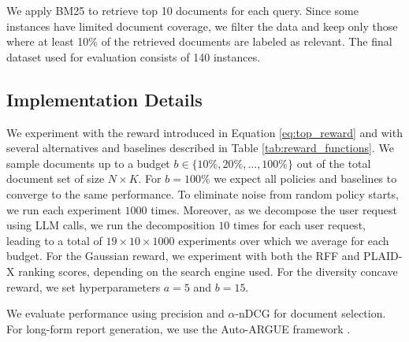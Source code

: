  We apply BM25 to retrieve top 10 documents for each query. Since some instances have limited document coverage, we filter the data and keep only those where at least 10\% of the retrieved documents are labeled as relevant. The final dataset used for evaluation consists of 140 instances.




\subsection{Implementation Details}

 We experiment with the reward introduced in Equation \ref{eq:top_reward} and with several alternatives and baselines described in Table \ref{tab:reward_functions}. We sample documents up to a budget \( b \in \{10\%, 20\%, \ldots, 100\%\} \) out of the total document set of size \(N \times K\). For \(b = 100\%\) we expect all policies and baselines to converge to the same performance. To eliminate noise from random policy starts, we run each experiment \(1000\) times. Moreover, as we decompose the user request using LLM calls, we run the decomposition \(10\) times for each user request, leading to a total of $19 \times 10 \times 1000$ experiments over which we average for each budget. For the Gaussian reward, we experiment with both the RFF and PLAID-X ranking scores, depending on the search engine used. For the diversity concave reward, we set hyperparameters \(a = 5\) and \(b = 15\). 

 We evaluate performance using precision and \(\alpha\)-nDCG \cite{alphandcg} for document selection. %
For long-form report generation, we use the Auto-ARGUE framework \cite{autoargue}.

